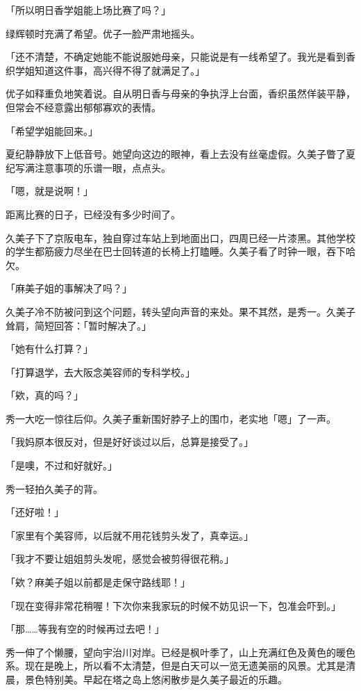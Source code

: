 \documentclass[UTF8]{ctexart}
\begin{document}
    「所以明日香学姐能上场比赛了吗？」 

    绿辉顿时充满了希望。优子一脸严肃地摇头。 

    「还不清楚，不确定她能不能说服她母亲，只能说是有一线希望了。我光是看到香织学姐知道这件事，高兴得不得了就满足了。」 

    优子如释重负地笑着说。自从明日香与母亲的争执浮上台面，香织虽然佯装平静，但常会不经意露出郁郁寡欢的表情。 

    「希望学姐能回来。」 

    夏纪静静放下上低音号。她望向这边的眼神，看上去没有丝毫虚假。久美子瞥了夏纪写满注意事项的乐谱一眼，点点头。 

    「嗯，就是说啊！」 

    距离比赛的日子，已经没有多少时间了。 

    久美子下了京阪电车，独自穿过车站上到地面出口，四周已经一片漆黑。其他学校的学生都筋疲力尽坐在巴士回转道的长椅上打瞌睡。久美子看了时钟一眼，吞下哈欠。 

    「麻美子姐的事解决了吗？」 

    久美子冷不防被问到这个问题，转头望向声音的来处。果不其然，是秀一。久美子耸肩，简短回答：「暂时解决了。」 

    「她有什么打算？」 

    「打算退学，去大阪念美容师的专科学校。」 

    「欸，真的吗？」 

    秀一大吃一惊往后仰。久美子重新围好脖子上的围巾，老实地「嗯」了一声。 

    「我妈原本很反对，但是好好谈过以后，总算是接受了。」 

    「是噢，不过和好就好。」 

    秀一轻拍久美子的背。 

    「还好啦！」 

    「家里有个美容师，以后就不用花钱剪头发了，真幸运。」 

    「我才不要让姐姐剪头发呢，感觉会被剪得很花稍。」 

    「欸？麻美子姐以前都是走保守路线耶！」 

    「现在变得非常花稍喔！下次你来我家玩的时候不妨见识一下，包准会吓到。」 

    「那……等我有空的时候再过去吧！」 

    秀一伸了个懒腰，望向宇治川对岸。已经是枫叶季了，山上充满红色及黄色的暖色系。现在是晚上，所以看不太清楚，但是白天可以一览无遗美丽的风景。尤其是清晨，景色特别美。早起在塔之岛上悠闲散步是久美子最近的乐趣。 
\end{document}

